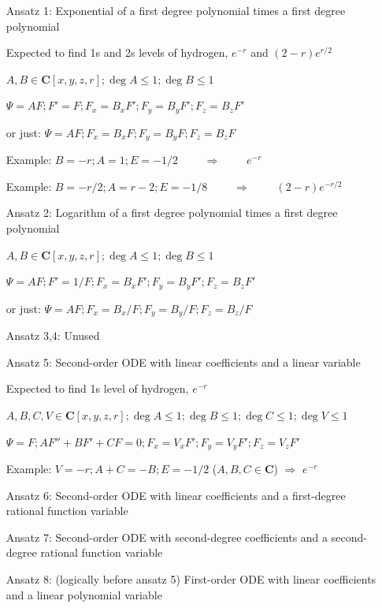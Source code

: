 \documentclass{article}
\begin{document}
\begin{itemize}
\item[Ansatz 1:] Exponential of a first degree polynomial times a first degree polynomial

Expected to find 1s and 2s levels of hydrogen, $e^{-r}$ and $(2-r)e^{r/2}$

$A,B \in \mathbf{C}[x,y,z,r]; \deg A \le 1; \deg B \le 1$

$\Psi = A F; F' = F; F_x = B_x F'; F_y = B_y F'; F_z = B_z F'$

or just: $\Psi = A F; F_x = B_x F; F_y = B_y F; F_z = B_z F$

Example: $B=-r; A=1; E=-1/2$ $\qquad\Rightarrow\qquad$ $e^{-r}$

Example: $B=-r/2; A=r-2; E=-1/8$ $\qquad\Rightarrow\qquad$ $(2-r)e^{-r/2}$

\item[Ansatz 2:] Logarithm of a first degree polynomial times a first degree polynomial

$A,B \in \mathbf{C}[x,y,z,r]; \deg A \le 1; \deg B \le 1$

$\Psi = A F; F' = 1/F; F_x = B_x F'; F_y = B_y F'; F_z = B_z F'$

or just: $\Psi = A F; F_x = B_x / F; F_y = B_y / F; F_z = B_z / F$

\item[Ansatz 3,4:] Unused

\item[Ansatz 5:] Second-order ODE with linear coefficients and a linear variable

Expected to find 1s level of hydrogen, $e^{-r}$

$A,B,C,V \in \mathbf{C}[x,y,z,r]; \deg A \le 1; \deg B \le 1; \deg C \le 1; \deg V \le 1$

$\Psi = F; A F'' + B F' + C F = 0; F_x = V_x F'; F_y = V_y F'; F_z = V_z F'$

Example: $V=-r; A+C=-B; E=-1/2$ ($A, B, C \in \mathbf{C}$) $\Rightarrow$ $e^{-r}$

\item[Ansatz 6:] Second-order ODE with linear coefficients and a first-degree rational function variable

\item[Ansatz 7:] Second-order ODE with second-degree coefficients and a second-degree rational function variable

\item[Ansatz 8:] (logically before ansatz 5) First-order ODE with linear coefficients and a linear polynomial variable


\end{itemize}
\end{document}
